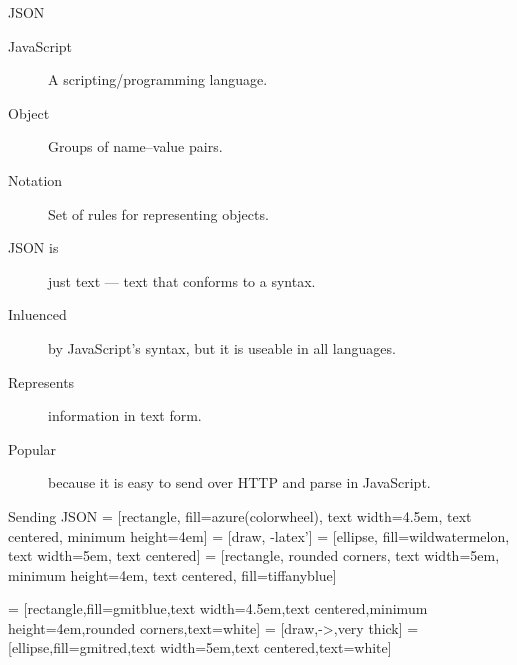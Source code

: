 \begin{frame}{JSON}
  \begin{description}
    \item[JavaScript] A scripting/programming language.
    \item[Object] Groups of name--value pairs.
    \item[Notation] Set of rules for representing objects.\\[1cm]
    \item[JSON is] just text --- text that conforms to a syntax.
    \item[Inluenced] by JavaScript's syntax, but it is useable in all languages.
    \item[Represents] information in text form.
    \item[Popular] because it is easy to send over HTTP and parse in JavaScript.
  \end{description}
\end{frame}

\begin{frame}{Sending JSON}
   = [rectangle, fill=azure(colorwheel), text width=4.5em, text centered, minimum height=4em]
   = [draw, -latex']
   = [ellipse, fill=wildwatermelon, text width=5em, text centered]
   = [rectangle, rounded corners, text width=5em, minimum height=4em, text centered, fill=tiffanyblue]
  
  \begin{adjustbox}{max totalsize={.9\textwidth}{.6\textheight},center}
  
   = [rectangle,fill=gmitblue,text width=4.5em,text centered,minimum height=4em,rounded corners,text=white]
   = [draw,->,very thick]
   = [ellipse,fill=gmitred,text width=5em,text centered,text=white]
    
  \end{adjustbox}
\end{frame}

